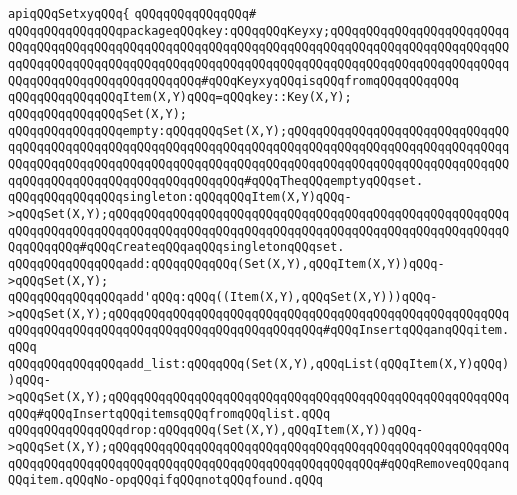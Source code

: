 \verb|apiqQQqSetxyqQQq{|\newline
\verb|qQQqqQQqqQQqqQQq#|\newline
\verb|qQQqqQQqqQQqqQQqpackageqQQqkey:qQQqqQQqKeyxy;qQQqqQQqqQQqqQQqqQQqqQQqqQQqqQQqqQQqqQQqqQQqqQQqqQQqqQQqqQQqqQQqqQQqqQQqqQQqqQQqqQQqqQQqqQQqqQQqqQQqqQQqqQQqqQQqqQQqqQQqqQQqqQQqqQQqqQQqqQQqqQQqqQQqqQQqqQQqqQQqqQQqqQQqqQQqqQQqqQQqqQQqqQQqqQQq#qQQqKeyxyqQQqisqQQqfromqQQqqQQqqQQq|\newline
\newline
\verb|qQQqqQQqqQQqqQQqItem(X,Y)qQQq=qQQqkey::Key(X,Y);|\newline
\verb|qQQqqQQqqQQqqQQqSet(X,Y);|\newline
\newline
\verb|qQQqqQQqqQQqqQQqempty:qQQqqQQqSet(X,Y);qQQqqQQqqQQqqQQqqQQqqQQqqQQqqQQqqQQqqQQqqQQqqQQqqQQqqQQqqQQqqQQqqQQqqQQqqQQqqQQqqQQqqQQqqQQqqQQqqQQqqQQqqQQqqQQqqQQqqQQqqQQqqQQqqQQqqQQqqQQqqQQqqQQqqQQqqQQqqQQqqQQqqQQqqQQqqQQqqQQqqQQqqQQqqQQqqQQqqQQqqQQq#qQQqTheqQQqemptyqQQqset.|\newline
\newline
\verb|qQQqqQQqqQQqqQQqsingleton:qQQqqQQqItem(X,Y)qQQq->qQQqSet(X,Y);qQQqqQQqqQQqqQQqqQQqqQQqqQQqqQQqqQQqqQQqqQQqqQQqqQQqqQQqqQQqqQQqqQQqqQQqqQQqqQQqqQQqqQQqqQQqqQQqqQQqqQQqqQQqqQQqqQQqqQQqqQQqqQQqqQQqqQQq#qQQqCreateqQQqaqQQqsingletonqQQqset.|\newline
\newline
\verb|qQQqqQQqqQQqqQQqadd:qQQqqQQqqQQq(Set(X,Y),qQQqItem(X,Y))qQQq->qQQqSet(X,Y);|\newline
\verb|qQQqqQQqqQQqqQQqadd'qQQq:qQQq((Item(X,Y),qQQqSet(X,Y)))qQQq->qQQqSet(X,Y);qQQqqQQqqQQqqQQqqQQqqQQqqQQqqQQqqQQqqQQqqQQqqQQqqQQqqQQqqQQqqQQqqQQqqQQqqQQqqQQqqQQqqQQqqQQqqQQqqQQq#qQQqInsertqQQqanqQQqitem.qQQq|\newline
\newline
\verb|qQQqqQQqqQQqqQQqadd_list:qQQqqQQq(Set(X,Y),qQQqList(qQQqItem(X,Y)qQQq))qQQq->qQQqSet(X,Y);qQQqqQQqqQQqqQQqqQQqqQQqqQQqqQQqqQQqqQQqqQQqqQQqqQQqqQQqqQQq#qQQqInsertqQQqitemsqQQqfromqQQqlist.qQQq|\newline
\newline
\verb|qQQqqQQqqQQqqQQqdrop:qQQqqQQq(Set(X,Y),qQQqItem(X,Y))qQQq->qQQqSet(X,Y);qQQqqQQqqQQqqQQqqQQqqQQqqQQqqQQqqQQqqQQqqQQqqQQqqQQqqQQqqQQqqQQqqQQqqQQqqQQqqQQqqQQqqQQqqQQqqQQqqQQqqQQqqQQq#qQQqRemoveqQQqanqQQqitem.qQQqNo-opqQQqifqQQqnotqQQqfound.qQQq|\newline
\newline

